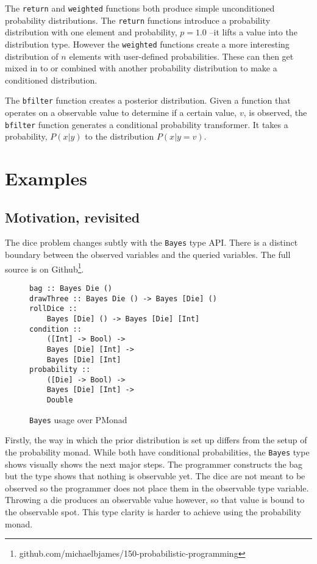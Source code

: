 \documentclass[9pt,twocolumn]{article}
\begin{document}
The \texttt{return} and \texttt{weighted} functions both produce simple unconditioned probability distributions. The \texttt{return} functions introduce a probability distribution with one element and probability, $p=1.0$ --it lifts a value into the distribution type. However the \texttt{weighted} functions create a more interesting distribution of $n$ elements with user-defined probabilities. These can then get mixed in to or combined with another probability distribution to make a conditioned distribution.

The \texttt{bfilter} function creates a posterior distribution. Given a function that operates on a observable value to determine if a certain value, $v$, is observed, the \texttt{bfilter} function generates a conditional probability transformer. It takes a probability, $P(x | y)$ to the distribution $P(x | y = v)$.

\section{Examples}
\subsection{Motivation, revisited}
The dice problem changes subtly with the \texttt{Bayes} type API. There is a distinct boundary between the observed variables and the queried variables. The full source is on Github\footnote{github.com/michaelbjames/150-probabilistic-programming}.
\begin{figure}[H]
\begin{verbatim}
bag :: Bayes Die ()
drawThree :: Bayes Die () -> Bayes [Die] ()
rollDice ::
    Bayes [Die] () -> Bayes [Die] [Int]
condition ::
    ([Int] -> Bool) ->
    Bayes [Die] [Int] ->
    Bayes [Die] [Int]
probability ::
    ([Die] -> Bool) ->
    Bayes [Die] [Int] ->
    Double
\end{verbatim}
\caption{\texttt{Bayes} usage over PMonad}
\end{figure}
Firstly, the way in which the prior distribution is set up differs from the setup of the probability monad. While both have conditional probabilities, the \texttt{Bayes} type shows visually shows the next major steps. The programmer constructs the bag but the type shows that nothing is observable yet. The dice are not meant to be observed so the programmer does not place them in the observable type variable. Throwing a die produces an observable value however, so that value is bound to the observable spot. This type clarity is harder to achieve using the probability monad.
\end{document}
